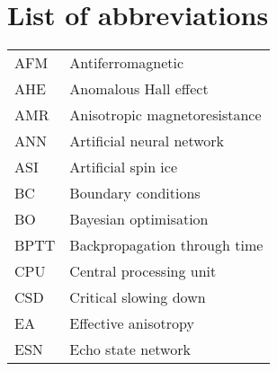 \chapter{List of abbreviations}
{ %
    \addtolength{\skip\footins}{1pc}
    \begin{longtable}[l]{ll}
        AFM   & Antiferromagnetic                          \\
        AHE   & Anomalous Hall effect                       \\
        AMR   & Anisotropic magnetoresistance               \\
        ANN   & Artificial neural network                   \\
        ASI   & Artificial spin ice                         \\
        BC    & Boundary conditions                         \\
        BO    & Bayesian optimisation                       \\
        BPTT  & Backpropagation through time                \\
        CPU   & Central processing unit                     \\
        CSD   & Critical slowing down                       \\
        EA    & Effective anisotropy                        \\
        ESN   & Echo state network                          \\

\end{longtable}}
